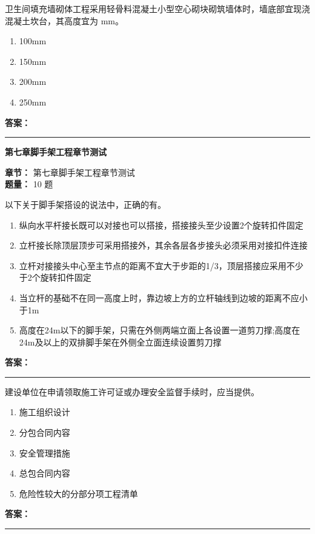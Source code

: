 \documentclass[UTF8,fontset=fandol,11pt]{ctexart}
\newcommand{\chaptertitle}[1]{\vspace{0.5em}\begin{tcolorbox}[enhanced,colback=deepblue,colframe=deepblue,arc=2mm,boxrule=0pt]\begin{center}\Large\bfseries\color{white}#1\end{center}\end{tcolorbox}\vspace{0.5em}}
\newcommand{\answerline}{\textcolor{answerred}{\rule{2.4cm}{0.7pt}}}
\begin{document}
\begin{quizbox}[title={第 31 题}]
卫生间填充墙砌体工程采用轻骨料混凝土小型空心砌块砌筑墙体时，墙底部宜现浇混凝土坎台，其高度宜为 mm。\\
\begin{enumerate}[label=\Alph*.]
\item 100mm
\item 150mm
\item 200mm
\item 250mm
\end{enumerate}
\textbf{\textcolor{answerred}{答案：}} \answerline
\end{quizbox}

\vspace{0.2em}

\chaptertitle{第七章脚手架工程章节测试}
\begin{mainbox}
\textbf{\textcolor{mainblue}{章节：}} 第七章脚手架工程章节测试\\
\textbf{\textcolor{answerred}{题量：}} 10 题
\end{mainbox}

\begin{quizbox}[title={第 1 题}]
以下关于脚手架搭设的说法中，正确的有。\\
\begin{enumerate}[label=\Alph*.]
\item 纵向水平杆接长既可以对接也可以搭接，搭接接头至少设置2个旋转扣件固定
\item 立杆接长除顶层顶步可采用搭接外，其余各层各步接头必须采用对接扣件连接
\item 立杆对接接头中心至主节点的距离不宜大于步距的1/3，顶层搭接应采用不少于2个旋转扣件固定
\item 当立杆的基础不在同一高度上时，靠边坡上方的立杆轴线到边坡的距离不应小于1m
\item 高度在24m以下的脚手架，只需在外侧两端立面上各设置一道剪刀撑;高度在24m及以上的双排脚手架在外侧全立面连续设置剪刀撑
\end{enumerate}
\textbf{\textcolor{answerred}{答案：}} \answerline
\end{quizbox}

\vspace{0.2em}

\begin{quizbox}[title={第 2 题}]
建设单位在申请领取施工许可证或办理安全监督手续时，应当提供。\\
\begin{enumerate}[label=\Alph*.]
\item 施工组织设计
\item 分包合同内容
\item 安全管理措施
\item 总包合同内容
\item 危险性较大的分部分项工程清单
\end{enumerate}
\textbf{\textcolor{answerred}{答案：}} \answerline
\end{quizbox}
\end{document}
